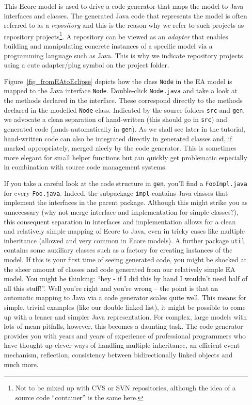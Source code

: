 This Ecore model is used to drive a code generator that maps the model to Java
interfaces and classes.  The generated Java code that represents the model is
often referred to as a \emph{repository} and this is the reason why we refer to
such projects as repository projects\footnote{Not to be mixed up with CVS or SVN
repositories, although the idea of a source code ``container'' is the same
here.}. A repository can be viewed as an \emph{adapter} that enables building and
manipulating concrete instances of a specific model via a programming language
such as Java.  This is why we indicate repository projects using a cute
adapter/plug symbol on the project folder.  

Figure~\ref{fig_fromEAtoEclipse} depicts how the class \texttt{Node} in the EA
model is mapped to the Java interface \texttt{Node}.  Double-click
\texttt{Node.java} and take a look at the methods declared in the interface.
These correspond directly to the methods declared in the modelled \texttt{Node}
class.  Indicated by the source folders \texttt{src} and \texttt{gen}, we
advocate a clean separation of hand-written (this should go in \texttt{src}) and
generated code (lands automatically in \texttt{gen}).  As we shall see later in
the tutorial, hand-written code can also be integrated directly in generated
classes and, if marked appropriately, merged nicely by the code generator. 
This is sometimes more elegant for small helper functions but can quickly get
problematic especially in combination with source code management systems.

If you take a careful look at the code structure in \texttt{gen},
you'll find a \texttt{Foo\-Impl.java} for every \texttt{Foo.java}. Indeed, the 
subpackage \texttt{impl} contains Java classes that implement the interfaces in
the parent package.  Although this might strike you as unnecessary (why not
merge interface and implementation for simple classes?), this consequent
separation in interfaces and implementation allows for a clean and relatively
simple mapping of Ecore to Java, even in tricky cases like multiple inheritance
(allowed and very common in Ecore models).  A further package \texttt{util}
contains some auxiliary classes such as a factory for creating instances of the
model.  If this is your first time of seeing generated code, you might be
shocked at the sheer amount of classes and code generated from our relatively
simple EA model.  You might be thinking: ``hey - if I did this by hand I
wouldn't need half of all this stuff!''.  Well you're right and you're wrong --
the point is that an automatic mapping to Java via a code generator scales quite
well.  This means for simple, trivial examples (like our double linked list), it
might be possible to come up with a leaner and simpler Java representation.  For
complex, large models with lots of mean pitfalls, however, this becomes a
daunting task.  The code generator provides you with years and years of
experience of professional programmers who have thought up clever ways
of handling multiple inheritance, an efficient event mechanism, reflection,
consistency between bidirectionally linked objects and much more.

